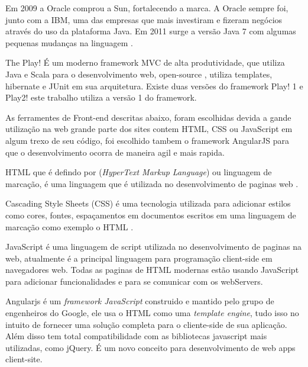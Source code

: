Em 2009 a Oracle comprou a Sun, fortalecendo a marca. A Oracle sempre foi, junto com a IBM, uma das empresas que mais investiram e fizeram negócios através do uso da plataforma Java. Em 2011 surge a versão Java 7 com algumas pequenas mudanças na linguagem \cite{caelum}.\par


The Play! É um moderno framework MVC de alta produtividade, que utiliza Java e Scala para o desenvolvimento web, open-source , utiliza templates, hibernate e JUnit  em sua arquitetura. Existe duas versões do framework Play! 1 e Play2! este trabalho utiliza a versão 1 do framework\cite{playframework}.\par



As ferramentes de Front-end descritas abaixo, foram escolhidas devida a gande utilização na web grande parte dos sites contem HTML, CSS ou JavaScript em algum trexo de seu código, foi escolhido tambem o framework AngularJS para que o desenvolvimento ocorra de maneira agil e mais rapida.\par

HTML que é defindo por (\textit{HyperText Markup Language}) ou linguagem de marcação, é uma linguagem que é utilizada no desenvolvimento de paginas web \cite{html}.\par

Cascading Style Sheets (CSS) é uma tecnologia utilizada para adicionar estilos como cores, fontes, espaçamentos em documentos escritos em uma linguagem de marcação como exemplo o HTML \cite{css}.\par


JavaScript é uma linguagem de script utilizada no desenvolvimento de paginas na web, atualmente é a principal linguagem para programação client-side em navegadores web. Todas as paginas de HTML modernas estão usando JavaScript para adicionar funcionalidades e para se comunicar com os webServers\cite{javascript}.\par

Angularjs é um \textit{framework JavaScript} construido e mantido pelo grupo de engenheiros do Google, ele usa o HTML como uma \textit{template engine}, tudo isso no intuito de fornecer uma solução completa para o cliente-side de sua aplicação. Além disso tem total compatibilidade com as bibliotecas javascript mais utilizadas, como jQuery. É um novo conceito para desenvolvimento de web apps client-site.\cite{angularjs}\par

